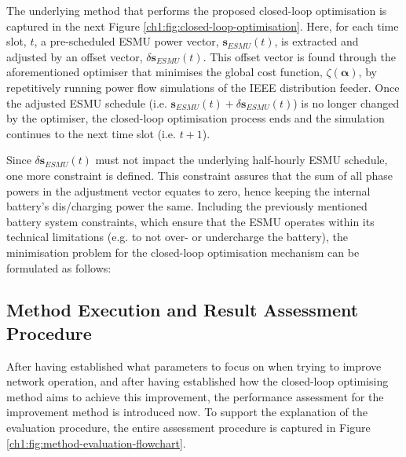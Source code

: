 

The underlying method that performs the proposed closed-loop optimisation is captured in the next Figure \ref{ch1:fig:closed-loop-optimisation}.
Here, for each time slot, $t$, a pre-scheduled ESMU power vector, $\textbf{s}_{ESMU}(t)$, is extracted and adjusted by an offset vector, $\delta \textbf{s}_{ESMU}(t)$.
This offset vector is found through the aforementioned optimiser that minimises the global cost function, $\zeta(\boldsymbol{\alpha})$, by repetitively running power flow simulations of the IEEE distribution feeder.
Once the adjusted ESMU schedule (i.e. $\textbf{s}_{ESMU}(t) + \delta \textbf{s}_{ESMU}(t)$) is no longer changed by the optimiser, the closed-loop optimisation process ends and the simulation continues to the next time slot (i.e. $t+1$).

Since $\delta \textbf{s}_{ESMU}(t)$ must not impact the underlying half-hourly ESMU schedule, one more constraint is defined.
This constraint assures that the sum of all phase powers in the adjustment vector equates to zero, hence keeping the internal battery's dis/charging power the same.
Including the previously mentioned battery system constraints, which ensure that the ESMU operates within its technical limitations (e.g. to not over- or undercharge the battery), the minimisation problem for the closed-loop optimisation mechanism can be formulated as follows:




\subsection{Method Execution and Result Assessment Procedure}
\label{ch1:subsec:method-execution}

After having established what parameters to focus on when trying to improve network operation, and after having established how the closed-loop optimising method aims to achieve this improvement, the performance assessment for the improvement method is introduced now.
To support the explanation of the evaluation procedure, the entire assessment procedure is captured in Figure \ref{ch1:fig:method-evaluation-flowchart}.



